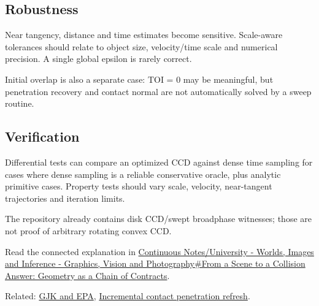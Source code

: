 \subsection{Robustness}\label{appendix-66956ed6c753-robustness}

Near tangency, distance and time estimates become sensitive. Scale-aware tolerances should relate to object size, velocity/time scale and numerical precision. A single global epsilon is rarely correct.

Initial overlap is also a separate case: TOI = 0 may be meaningful, but penetration recovery and contact normal are not automatically solved by a sweep routine.

\subsection{Verification}\label{appendix-66956ed6c753-verification}

Differential tests can compare an optimized CCD against dense time sampling for cases where dense sampling is a reliable conservative oracle, plus analytic primitive cases. Property tests should vary scale, velocity, near-tangent trajectories and iteration limits.

The repository already contains disk CCD/swept broadphase witnesses; those are not proof of arbitrary rotating convex CCD.

Read the connected explanation in \hyperref[03-visual-computing-i-ch020-from-a-scene-to-a-collision-answer-geometry-as-a-chain-of-contracts]{Continuous Notes/University - Worlds, Images and Inference - Graphics, Vision and Photography\#From a Scene to a Collision Answer: Geometry as a Chain of Contracts}.

Related: \hyperref[appendix-aef6177f7b3f]{GJK and EPA}, \hyperref[appendix-f682275acbdf]{Incremental contact penetration refresh}.
